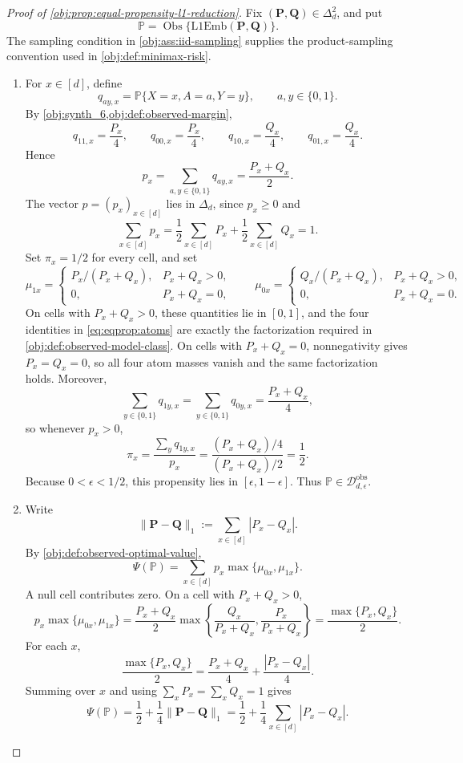 \begin{proof}[Proof of \cref{obj:prop:equal-propensity-l1-reduction}]
Fix \((\mathbf P,\mathbf Q)\in\Delta_d^2\), and put
\[
\mathbb P=\operatorname{Obs}\{\mathrm{L1Emb}(\mathbf P,\mathbf Q)\}.
\]
The sampling condition in \cref{obj:ass:iid-sampling} supplies the product-sampling convention used in \cref{obj:def:minimax-risk}.

\begin{enumerate}
\item For \(x\in[d]\), define
\[
q_{ay,x}=\mathbb P\{X=x,A=a,Y=y\},
\qquad a,y\in\{0,1\}.
\]
By \cref{obj:synth_6,obj:def:observed-margin},
\begin{equation}
\label{eq:eqprop:atoms}
q_{11,x}=\frac{P_x}{4},
\qquad
q_{00,x}=\frac{P_x}{4},
\qquad
q_{10,x}=\frac{Q_x}{4},
\qquad
q_{01,x}=\frac{Q_x}{4}.
\end{equation}
Hence
\[
p_x=\sum_{a,y\in\{0,1\}}q_{ay,x}
=\frac{P_x+Q_x}{2}.
\]
The vector \(p=(p_x)_{x\in[d]}\) lies in \(\Delta_d\), since \(p_x\ge0\) and
\[
\sum_{x\in[d]}p_x
=
\frac12\sum_{x\in[d]}P_x+\frac12\sum_{x\in[d]}Q_x
=1.
\]
Set \(\pi_x=1/2\) for every cell, and set
\[
\mu_{1x}=
\begin{cases}
P_x/(P_x+Q_x),& P_x+Q_x>0,\\
0,& P_x+Q_x=0,
\end{cases}
\qquad
\mu_{0x}=
\begin{cases}
Q_x/(P_x+Q_x),& P_x+Q_x>0,\\
0,& P_x+Q_x=0.
\end{cases}
\]
On cells with \(P_x+Q_x>0\), these quantities lie in \([0,1]\), and the four identities in
\cref{eq:eqprop:atoms} are exactly the factorization required in \cref{obj:def:observed-model-class}.
On cells with \(P_x+Q_x=0\), nonnegativity gives \(P_x=Q_x=0\), so all four atom masses vanish and
the same factorization holds. Moreover,
\[
\sum_{y\in\{0,1\}}q_{1y,x}
=
\sum_{y\in\{0,1\}}q_{0y,x}
=
\frac{P_x+Q_x}{4},
\]
so whenever \(p_x>0\),
\[
\pi_x
=
\frac{\sum_y q_{1y,x}}{p_x}
=
\frac{(P_x+Q_x)/4}{(P_x+Q_x)/2}
=
\frac12.
\]
Because \(0<\epsilon<1/2\), this propensity lies in \([\epsilon,1-\epsilon]\). Thus
\(\mathbb P\in\mathcal D_{d,\epsilon}^{\mathrm{obs}}\). %

\item Write
\[
\|\mathbf P-\mathbf Q\|_1:=\sum_{x\in[d]}|P_x-Q_x|.
\]
By \cref{obj:def:observed-optimal-value},
\[
\Psi(\mathbb P)
=
\sum_{x\in[d]}p_x\max\{\mu_{0x},\mu_{1x}\}.
\]
A null cell contributes zero. On a cell with \(P_x+Q_x>0\),
\[
p_x\max\{\mu_{0x},\mu_{1x}\}
=
\frac{P_x+Q_x}{2}
\max\left\{\frac{Q_x}{P_x+Q_x},\frac{P_x}{P_x+Q_x}\right\}
=
\frac{\max\{P_x,Q_x\}}2.
\]
For each \(x\),
\[
\frac{\max\{P_x,Q_x\}}2
=
\frac{P_x+Q_x}{4}+\frac{|P_x-Q_x|}{4}.
\]
Summing over \(x\) and using \(\sum_xP_x=\sum_xQ_x=1\) gives
\begin{equation}
\label{eq:eqprop:value}
\Psi(\mathbb P)
=
\frac12+\frac14\|\mathbf P-\mathbf Q\|_1
=
\frac12+\frac14\sum_{x\in[d]}|P_x-Q_x|.
\end{equation} %


\end{enumerate}
\end{proof}

